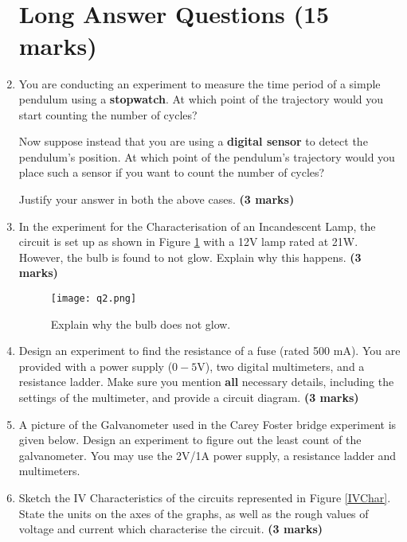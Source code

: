 \begin{enumerate}
\newpage
~\\
~\\
\newpage
\section*{Long Answer Questions \hfill (15 marks)}



\item You are conducting an experiment to measure the time period of a simple pendulum using a \textbf{stopwatch}. At which point of the trajectory would you start counting the number of cycles? 

Now suppose instead that you are using a \textbf{digital sensor} to detect the pendulum's position. At which point of the pendulum's trajectory would you place such a sensor if you want to count the number of cycles?

Justify your answer in both the above cases.  \hfill \textbf{(3 marks)}


\item In the experiment for the Characterisation of an Incandescent Lamp, the circuit is set up as shown in Figure \ref{incandCirc} with a 12V lamp rated at 21W. However, the bulb is found to not glow. Explain why this happens.  \hfill \textbf{(3 marks)}

\begin{figure}[!htb]
\centering
\texttt{[image: q2.png]}
\caption{Explain why the bulb does not glow.}
\label{incandCirc}
\end{figure}


\item Design an experiment to find the resistance of a fuse (rated 500 mA). You are provided with a power supply ($0-5$V), two digital multimeters, and a resistance ladder. Make sure you mention \textbf{all} necessary details, including the settings of the multimeter, and provide a circuit diagram. \hfill \textbf{(3 marks)}

\item A picture of the Galvanometer used in the Carey Foster bridge experiment is given below. Design an experiment to figure out the least count of the galvanometer. You may use the 2V/1A power supply, a resistance ladder and multimeters.

\item Sketch the IV Characteristics of the circuits represented in Figure \ref{IVChar}. State the units on the axes of the graphs, as well as the rough values of voltage and current which characterise the circuit. \hfill \textbf{(3 marks)}


\end{enumerate}
